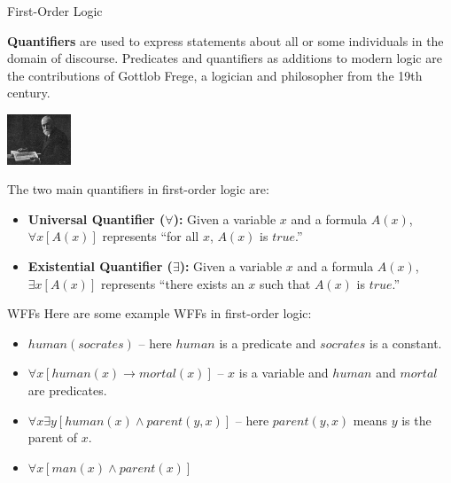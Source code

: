 \documentclass{beamer}
\begin{document}
\begin{frame}{First-Order Logic}

{\bf Quantifiers} are used to express statements about all or some individuals in the domain of discourse. Predicates and quantifiers as additions to modern logic are the contributions of 
Gottlob Frege, a logician and philosopher from the 19th  century.

\begin{center}
    \includegraphics[height=15mm]{images/gottlob-frege}
\end{center}

The two main quantifiers in first-order logic are:
\begin{itemize}
\item
{\bf Universal Quantifier ($\forall$):} Given a variable $x$ and a formula $A(x)$, $\forall x [A(x)]$ represents ``for all $x$, $A(x)$ is $\mathit{true}$.''

\item
{\bf Existential Quantifier ($\exists$):} Given a variable $x$ and a formula $A(x)$, $\exists x [A(x)]$ represents ``there exists an $x$ such that $A(x)$ is $\mathit{true}$.''
\end{itemize}

\end{frame}

\begin{frame}{WFFs}
Here are some example WFFs in first-order logic:
\begin{itemize}
\item
$\mathit{human}(\mathit{socrates})$ -- here $\mathit{human}$ is a predicate and $\mathit{socrates}$ is a constant.

\item
$\forall x[\mathit{human}(x) \rightarrow \mathit{mortal}(x)]$ -- $x$ is a variable and $\mathit{human}$ and
$\mathit{mortal}$ are predicates.

\item
$\forall x \exists y [\mathit{human}(x) \wedge \mathit{parent}(y,x)]$ -- here $\mathit{parent}(y,x)$ means
$y$ is the parent of $x$.

\item
$\forall x[\mathit{man}(x) \wedge \mathit{parent}(x)]$
\end{itemize}
\end{frame}
\end{document}
